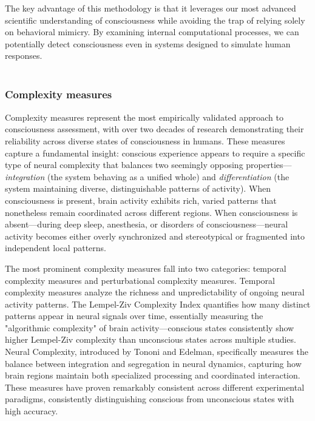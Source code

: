 \documentclass[11pt,a4paper]{article}
\begin{document}
The key advantage of this methodology is that it leverages our most advanced scientific understanding of consciousness while avoiding the trap of relying solely on behavioral mimicry. By examining internal computational processes, we can potentially detect consciousness even in systems designed to simulate human responses.
\\
\\
\label{sec:background}

\subsubsection{Complexity measures}

Complexity measures represent the most empirically validated approach to consciousness assessment, with over two decades of research demonstrating their reliability across diverse states of consciousness in humans. These measures capture a fundamental insight: conscious experience appears to require a specific type of neural complexity that balances two seemingly opposing properties—\textit{integration} (the system behaving as a unified whole) and \textit{differentiation} (the system maintaining diverse, distinguishable patterns of activity). When consciousness is present, brain activity exhibits rich, varied patterns that nonetheless remain coordinated across different regions. When consciousness is absent—during deep sleep, anesthesia, or disorders of consciousness—neural activity becomes either overly synchronized and stereotypical or fragmented into independent local patterns.

The most prominent complexity measures fall into two categories: temporal complexity measures and perturbational complexity measures. Temporal complexity measures analyze the richness and unpredictability of ongoing neural activity patterns. The Lempel-Ziv Complexity Index quantifies how many distinct patterns appear in neural signals over time, essentially measuring the "algorithmic complexity" of brain activity—conscious states consistently show higher Lempel-Ziv complexity than unconscious states across multiple studies. Neural Complexity, introduced by Tononi and Edelman, specifically measures the balance between integration and segregation in neural dynamics, capturing how brain regions maintain both specialized processing and coordinated interaction. These measures have proven remarkably consistent across different experimental paradigms, consistently distinguishing conscious from unconscious states with high accuracy.
\end{document}
